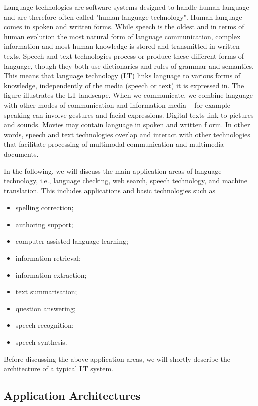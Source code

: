 \begin{multicols}{2}

Language technologies are software systems designed to handle human language and are therefore often called "human language technology". Human language comes in spoken and written forms. While speech is the oldest and in terms of human evolution the most natural form of language communication, complex information and most human knowledge is stored and transmitted in written texts. Speech and text technologies process or produce these different forms of language, though they both use dictionaries and rules of grammar and semantics. This means that language technology (LT) links language to various forms of knowledge, independently of the media (speech or text) it is expressed in. The figure illustrates the LT landscape. When we communicate, we combine language with other modes of communication and information media – for example speaking can involve gestures and facial expressions. Digital texts link to pictures and sounds. Movies may contain language in spoken and written f
 orm. In other words, speech and text technologies overlap and interact with other technologies that facilitate processing of multimodal communication and multimedia documents. 

In the following, we will discuss the main application areas of language technology, i.e., language checking, web search, speech technology, and machine translation. This includes applications and basic technologies such as 
\begin{itemize}
\item spelling correction;
\item authoring support;
\item computer-assisted language learning;
\item information retrieval;
\item information extraction;
\item text summarisation;
\item question answering;
\item speech recognition; 
\item speech synthesis.
\end{itemize}

Before discussing the above application areas, we will shortly describe the architecture of a typical LT system. 

\subsection{Application Architectures}


\end{multicols}
